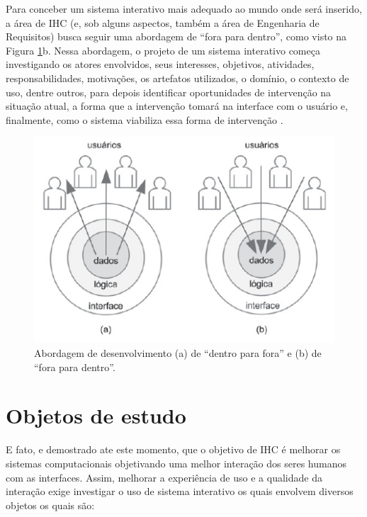 Para conceber um sistema interativo mais adequado ao mundo onde será inserido,
a área de IHC (e, sob alguns aspectos, também a área de Engenharia de Requisitos)
busca seguir uma abordagem de ``fora para dentro'', como visto na Figura \ref{fig:abordagens-de-desenvolvimento}b. Nessa abordagem, o projeto de um sistema interativo começa investigando os atores envolvidos, seus interesses, objetivos, atividades, responsabilidades, motivações, os artefatos utilizados, o domínio, o contexto de uso, dentre outros, para depois identificar oportunidades de intervenção na situação atual, a forma que a intervenção tomará na interface com o usuário e, finalmente, como o sistema viabiliza essa forma de intervenção \cite{barbosa2010IHC}.

\begin{figure}[H]
    \centering
    \includegraphics[scale=0.5]{imagens/abordagem-desenvolvimento.png}
    \caption{Abordagem de desenvolvimento (a) de ``dentro para fora'' e (b) de ``fora para dentro''.}
    \label{fig:abordagens-de-desenvolvimento}
\end{figure}

\section{Objetos de estudo}
E fato, e demostrado ate este momento, que o objetivo de IHC é melhorar os sistemas computacionais objetivando uma melhor interação dos seres humanos com as interfaces. Assim, melhorar a experiência de uso e a qualidade da interação exige investigar o uso de sistema interativo os quais envolvem diversos objetos os quais são: 


